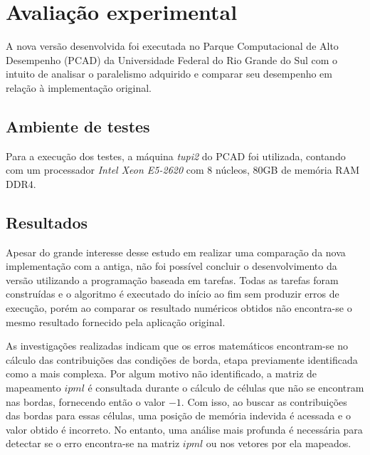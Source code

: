 \documentclass[cic,tc]{iiufrgs}
\begin{document}
\chapter{Avaliação experimental}\label{sec:exp}
A nova versão desenvolvida foi executada no Parque Computacional de Alto Desempenho (PCAD) da Universidade Federal do Rio Grande do Sul com o
intuito de analisar o paralelismo adquirido e comparar seu desempenho em relação à implementação original.

\section{Ambiente de testes}
Para a execução dos testes, a máquina \textit{tupi2} do PCAD foi utilizada, contando com um processador \textit{Intel Xeon E5-2620} com $8$
núcleos, $80$GB de memória RAM DDR$4$.
\section{Resultados}

Apesar do grande interesse desse estudo em realizar uma comparação da nova implementação com a antiga, não foi possível concluir o desenvolvimento da versão utilizando
a programação baseada em tarefas. Todas as tarefas foram construídas e o algoritmo é executado do início ao fim sem produzir erros de execução, porém ao comparar os resultado
numéricos obtidos não encontra-se o mesmo resultado fornecido pela aplicação original.

As investigações realizadas indicam que os erros matemáticos encontram-se no cálculo das contribuições das condições de borda, etapa previamente identificada como
a mais complexa. Por algum motivo não identificado, a matriz de mapeamento $ipml$ é consultada durante o cálculo de células que não se encontram nas bordas, fornecendo
então o valor $-1$. Com isso, ao buscar as contribuições das bordas para essas células, uma posição de memória indevida é acessada e o valor obtido é incorreto. No entanto,
uma análise mais profunda é necessária para detectar se o erro encontra-se na matriz $ipml$ ou nos vetores por ela mapeados.

\end{document}

